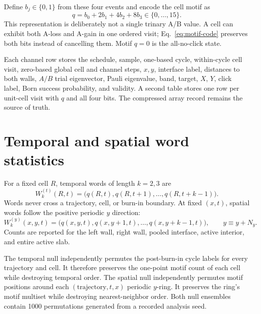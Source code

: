 \documentclass[aps,prb,onecolumn,nofootinbib,superscriptaddress]{revtex4-2}
\begin{document}
Define \(b_j\in\{0,1\}\) from these four events and encode the cell motif as
\begin{equation}
 q=b_0+2b_1+4b_2+8b_3\in\{0,\ldots,15\}.
 \label{eq:motif-code}
\end{equation}
This representation is deliberately not a single trinary A/B value.  A cell
can exhibit both A-loss and A-gain in one ordered visit; Eq.~\eqref{eq:motif-code}
preserves both bits instead of cancelling them.  Motif \(q=0\) is the
all-no-click state.

Each channel row stores the schedule, sample, one-based cycle, within-cycle
cell visit, zero-based global cell and channel steps, \(x,y\), interface label,
distances to both walls, \(A/B\) trial eigenvector, Pauli eigenvalue, band,
target, \(X\), \(Y\), click label, Born success probability, and validity.
A second table stores one row per unit-cell visit with \(q\) and all four bits.
The compressed array record remains the source of truth.

\section{Temporal and spatial word statistics}

For a fixed cell \(R\), temporal words of length \(k=2,3\) are
\begin{equation}
 W^{(t)}_{k}(R,t)=
 \big(q(R,t),q(R,t+1),\ldots,q(R,t+k-1)\big).
\end{equation}
Words never cross a trajectory, cell, or burn-in boundary.  At fixed
\((x,t)\), spatial words follow the positive periodic \(y\) direction:
\begin{equation}
 W^{(y)}_{k}(x,y,t)=
 \big(q(x,y,t),q(x,y+1,t),\ldots,q(x,y+k-1,t)\big),
 \qquad y\equiv y+N_y.
\end{equation}
Counts are reported for the left wall, right wall, pooled interface, active
interior, and entire active slab.

The temporal null independently permutes the post-burn-in cycle labels for
every trajectory and cell.  It therefore preserves the one-point motif count
of each cell while destroying temporal order.  The spatial null independently
permutes motif positions around each \((\text{trajectory},t,x)\) periodic
\(y\)-ring.  It preserves the ring's motif multiset while destroying
nearest-neighbor order.  Both null ensembles contain 1000 permutations
generated from a recorded analysis seed.
\end{document}
